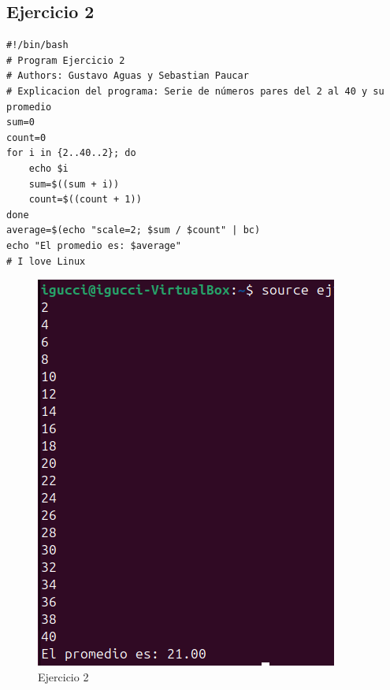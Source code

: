\documentclass[11pt,twoside]{book}
\begin{document}
\subsection{Ejercicio 2}
\begin{lstlisting}
#!/bin/bash
# Program Ejercicio 2
# Authors: Gustavo Aguas y Sebastian Paucar
# Explicacion del programa: Serie de números pares del 2 al 40 y su promedio
sum=0
count=0
for i in {2..40..2}; do
    echo $i
    sum=$((sum + i))
    count=$((count + 1))
done
average=$(echo "scale=2; $sum / $count" | bc)
echo "El promedio es: $average"
# I love Linux
\end{lstlisting}
\begin{figure}[h]
    \centering
    \includegraphics[width=0.5\linewidth]{series/ej2.png}
    \caption{Ejercicio 2}
\end{figure}
\newpage
\end{document}
